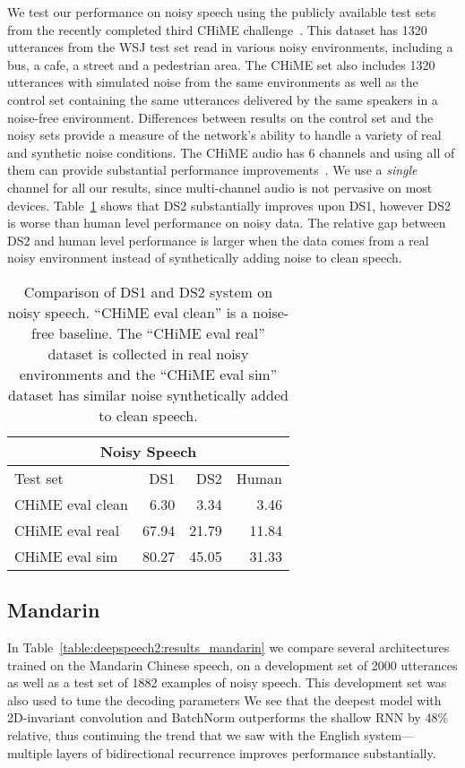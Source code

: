We test our performance on noisy speech using the publicly available test sets
from the recently completed third CHiME challenge~\cite{barker2015chime}. This
dataset has 1320 utterances from the WSJ test set read in various noisy
environments, including a bus, a cafe, a street and a pedestrian area. The
CHiME set also includes 1320 utterances with simulated noise from the same
environments as well as the control set containing the same utterances
delivered by the same speakers in a noise-free environment. Differences between
results on the control set and the noisy sets provide a measure of the
network's ability to handle a variety of real and synthetic noise conditions.
The CHiME audio has 6 channels and using all of them can provide substantial
performance improvements~\cite{yoshioka2015}. We use a {\it single} channel for
all our results, since multi-channel audio is not pervasive on most devices.
Table~\ref{table:deepspeech2:chime} shows that DS2 substantially improves upon
DS1, however DS2 is worse than human level performance on noisy data. The
relative gap between DS2 and human level performance is larger when the data
comes from a real noisy environment instead of synthetically adding noise to
clean speech.

\begin{table}
\centering
\begin{tabular}{l  r  r r}
\toprule
\multicolumn{4}{c}{Noisy Speech}\\
\midrule
Test set & DS1 & DS2  &  Human \\
\midrule
CHiME eval clean & 6.30  & 3.34  & 3.46 \\
CHiME eval real  & 67.94 & 21.79 & 11.84 \\
CHiME eval sim   & 80.27 & 45.05 & 31.33 \\
\bottomrule
\end{tabular}
\caption{Comparison of DS1 and DS2 system on noisy speech. ``CHiME eval clean''
         is a noise-free baseline. The ``CHiME eval real'' dataset is collected in
         real noisy environments and the ``CHiME eval sim'' dataset has similar
         noise synthetically added to clean speech.}
\label{table:deepspeech2:chime}
\end{table}

\subsection{Mandarin}
\label{sec:deepspeech2:results_mandarin}

In Table~\ref{table:deepspeech2:results_mandarin} we compare several
architectures trained on the Mandarin Chinese speech, on a development set of
2000 utterances as well as a test set of 1882 examples of noisy speech. This
development set was also used to tune the decoding parameters We see that the
deepest model with 2D-invariant convolution and BatchNorm outperforms the
shallow RNN by 48\% relative, thus continuing the trend that we saw with the
English system---multiple layers of bidirectional recurrence improves
performance substantially. 

